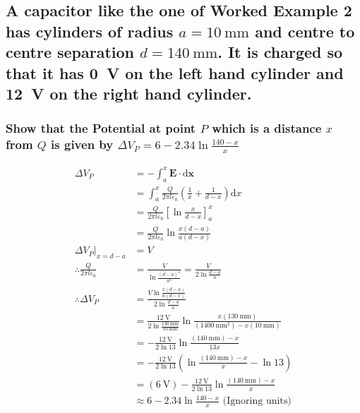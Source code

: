 \documentclass[a4paper]{scrartcl}
\begin{document}
\subsection{A capacitor like the one of Worked Example 2 has cylinders of radius \(a = \SI{10}{\milli\metre}\) and centre to centre separation \(d = \SI{140}{\milli\metre}\). It is charged so that it has \SI{0}{\volt} on the left hand cylinder and \SI{+12}{\volt} on the right hand cylinder.}
\subsubsection{Show that the Potential at point \(P\) which is a distance \(x\) from \(Q\) is given by \(\Delta V_P = 6 - 2.34 \ln{\frac{140 - x}{x}}\)}
\begin{align*}
    \Delta V_P &= -\int_a^x \mathbf{E} \cdot \mathrm{d}\mathbf{x} \\
    &= \int_a^x \frac{Q}{2 \pi l \varepsilon_0} \left( \frac{1}{x} + \frac{1}{d - x} \right) \mathrm{d}x \\
    &= \frac{Q}{2 \pi l \varepsilon_0} \left[ \ln{\frac{x}{d - x}} \right]_a^x \\
    &= \frac{Q}{2 \pi l \varepsilon_0} \ln{\frac{x (d - a)}{a (d - x)}} \\
    \Delta V_P \bigg|_{x = d - a} &= V \\
    \therefore \frac{Q}{2 \pi l \varepsilon_0} &= \frac{V}{\ln{\frac{(d - a)^2}{a^2}}} = \frac{V}{2 \ln{\frac{d - a}{a}}} \\
    \therefore \Delta V_P &= \frac{V \ln{\frac{x (d - a)}{a (d - x)}}}{2 \ln{\frac{d - a}{a}}} \\
    &= \frac{\SI{12}{\volt}}{2 \ln{\frac{\SI{130}{\milli\metre}}{\SI{10}{\milli\metre}}}} \ln{\frac{x (\SI{130}{\milli\metre})}{(\SI{1400}{\milli\metre\squared}) - x (\SI{10}{\milli\metre})}} \\
    &= -\frac{\SI{12}{\volt}}{2 \ln{13}} \ln{\frac{(\SI{140}{\milli\metre}) - x}{13 x}} \\
    &= -\frac{\SI{12}{\volt}}{2 \ln{13}} \left( \ln{\frac{(\SI{140}{\milli\metre}) - x}{x}} - \ln{13} \right) \\
    &= (\SI{6}{\volt}) - \frac{\SI{12}{\volt}}{2 \ln{13}} \ln{\frac{(\SI{140}{\milli\metre}) - x}{x}} \\
    &\approx 6 - 2.34 \ln{\frac{140 - x}{x}} \text{ (Ignoring units)}
\end{align*}
\end{document}
